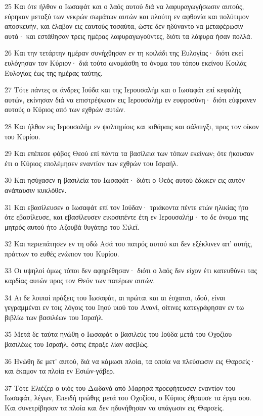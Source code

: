 \par 25 Και ότε ήλθον ο Ιωσαφάτ και ο λαός αυτού διά να λαφυραγωγήσωσιν αυτούς, εύρηκαν μεταξύ των νεκρών σωμάτων αυτών και πλούτη εν αφθονία και πολύτιμον αποσκευήν, και έλαβον εις εαυτούς τοσαύτα, ώστε δεν ηδύναντο να μεταφέρωσιν αυτά· και εστάθησαν τρεις ημέρας λαφυραγωγούντες, διότι τα λάφυρα ήσαν πολλά.
\par 26 Και την τετάρτην ημέραν συνήχθησαν εν τη κοιλάδι της Ευλογίας· διότι εκεί ευλόγησαν τον Κύριον· διά τούτο ωνομάσθη το όνομα του τόπου εκείνου Κοιλάς Ευλογίας έως της ημέρας ταύτης.
\par 27 Τότε πάντες οι άνδρες Ιούδα και της Ιερουσαλήμ και ο Ιωσαφάτ επί κεφαλής αυτών, εκίνησαν διά να επιστρέψωσιν εις Ιερουσαλήμ εν ευφροσύνη· διότι εύφρανεν αυτούς ο Κύριος από των εχθρών αυτών.
\par 28 Και ήλθον εις Ιερουσαλήμ εν ψαλτηρίοις και κιθάραις και σάλπιγξι, προς τον οίκον του Κυρίου.
\par 29 Και επέπεσε φόβος Θεού επί πάντα τα βασίλεια των τόπων εκείνων; ότε ήκουσαν έτι ο Κύριος επολέμησεν εναντίον των εχθρών του Ισραήλ.
\par 30 Και ησύχασεν η βασιλεία του Ιωσαφάτ· διότι ο Θεός αυτού έδωκεν εις αυτόν ανάπαυσιν κυκλόθεν.
\par 31 Και εβασίλευσεν ο Ιωσαφάτ επί τον Ιούδαν· τριάκοντα πέντε ετών ηλικίας ήτο ότε εβασίλευσε, και εβασίλευσεν εικοσιπέντε έτη εν Ιερουσαλήμ· το δε όνομα της μητρός αυτού ήτο Αζουβά θυγάτηρ του Σιλεΐ.
\par 32 Και περιεπάτησεν εν τη οδώ Ασά του πατρός αυτού και δεν εξέκλινεν απ' αυτής, πράττων το ευθές ενώπιον του Κυρίου.
\par 33 Οι υψηλοί όμως τόποι δεν αφηρέθησαν· διότι ο λαός δεν είχον έτι κατευθύνει τας καρδίας αυτών προς τον Θεόν των πατέρων αυτών.
\par 34 Αι δε λοιπαί πράξεις του Ιωσαφάτ, αι πρώται και αι έσχαται, ιδού, είναι γεγραμμέναι εν τοις λόγοις του Ιηού υιού του Ανανί, οίτινες κατεγράφησαν εν τω βιβλίω των βασιλέων του Ισραήλ.
\par 35 Μετά δε ταύτα ηνώθη ο Ιωσαφάτ ο βασιλεύς του Ιούδα μετά του Οχοζίου βασιλέως του Ισραήλ, όστις έπραξε λίαν ασεβώς.
\par 36 Ηνώθη δε μετ' αυτού, διά να κάμωσι πλοία, τα οποία να πλεύσωσιν εις Θαρσείς· και έκαμον τα πλοία εν Εσιών-γάβερ.
\par 37 Τότε Ελιέζερ ο υιός του Δωδανά από Μαρησά προεφήτευσεν εναντίον του Ιωσαφάτ, λέγων, Επειδή ηνώθης μετά του Οχοζίου, ο Κύριος έθραυσε τα έργα σου. Και συνετρίβησαν τα πλοία και δεν ηδυνήθησαν να υπάγωσιν εις Θαρσείς.

